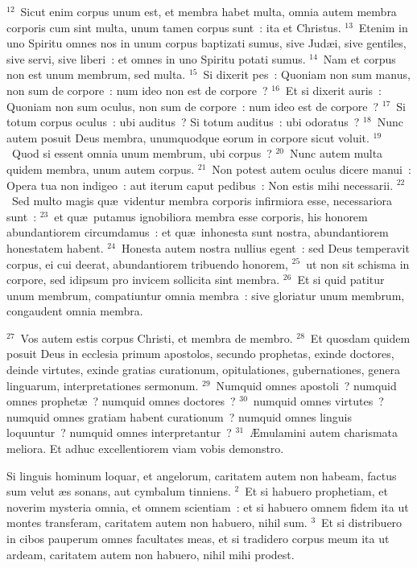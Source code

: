 ${}^{12}$~Sicut enim corpus unum est, et membra habet multa, omnia autem membra corporis cum sint multa, unum tamen corpus sunt~: ita et Christus.
${}^{13}$~Etenim in uno Spiritu omnes nos in unum corpus baptizati sumus, sive Jud\ae i, sive gentiles, sive servi, sive liberi~: et omnes in uno Spiritu potati sumus.
${}^{14}$~Nam et corpus non est unum membrum, sed multa.
${}^{15}$~Si dixerit pes~: Quoniam non sum manus, non sum de corpore~: num ideo non est de corpore~?
${}^{16}$~Et si dixerit auris~: Quoniam non sum oculus, non sum de corpore~: num ideo est de corpore~?
${}^{17}$~Si totum corpus oculus~: ubi auditus~? Si totum auditus~: ubi odoratus~?
${}^{18}$~Nunc autem posuit Deus membra, unumquodque eorum in corpore sicut voluit.
${}^{19}$~Quod si essent omnia unum membrum, ubi corpus~?
${}^{20}$~Nunc autem multa quidem membra, unum autem corpus.
${}^{21}$~Non potest autem oculus dicere manui~: Opera tua non indigeo~: aut iterum caput pedibus~: Non estis mihi necessarii.
${}^{22}$~Sed multo magis qu\ae\ videntur membra corporis infirmiora esse, necessariora sunt~:
${}^{23}$~et qu\ae\ putamus ignobiliora membra esse corporis, his honorem abundantiorem circumdamus~: et qu\ae\ inhonesta sunt nostra, abundantiorem honestatem habent.
${}^{24}$~Honesta autem nostra nullius egent~: sed Deus temperavit corpus, ei cui deerat, abundantiorem tribuendo honorem,
${}^{25}$~ut non sit schisma in corpore, sed idipsum pro invicem sollicita sint membra.
${}^{26}$~Et si quid patitur unum membrum, compatiuntur omnia membra~: sive gloriatur unum membrum, congaudent omnia membra.


${}^{27}$~Vos autem estis corpus Christi, et membra de membro.
${}^{28}$~Et quosdam quidem posuit Deus in ecclesia primum apostolos, secundo prophetas, exinde doctores, deinde virtutes, exinde gratias curationum, opitulationes, gubernationes, genera linguarum, interpretationes sermonum.
${}^{29}$~Numquid omnes apostoli~? numquid omnes prophet\ae~? numquid omnes doctores~?
${}^{30}$~numquid omnes virtutes~? numquid omnes gratiam habent curationum~? numquid omnes linguis loquuntur~? numquid omnes interpretantur~?
${}^{31}$~\AE mulamini autem charismata meliora. Et adhuc excellentiorem viam vobis demonstro.

\lettrine[lines=10,image=true,loversize=0.05,lraise=-0.03]{S}{}i linguis hominum loquar, et angelorum, caritatem autem non habeam, factus sum velut \ae s sonans, aut cymbalum tinniens.
${}^{2}$~Et si habuero prophetiam, et noverim mysteria omnia, et omnem scientiam~: et si habuero omnem fidem ita ut montes transferam, caritatem autem non habuero, nihil sum.
${}^{3}$~Et si distribuero in cibos pauperum omnes facultates meas, et si tradidero corpus meum ita ut ardeam, caritatem autem non habuero, nihil mihi prodest.



